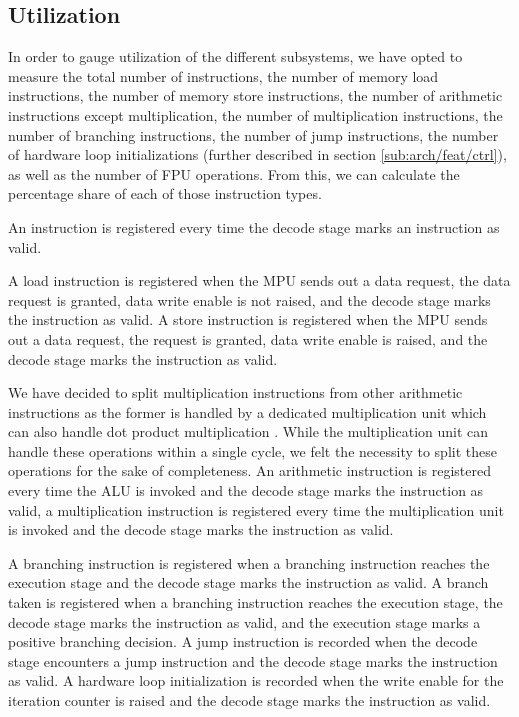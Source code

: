\documentclass[../bachelor_paper.tex]{subfiles}
\begin{document}
\subsection{Utilization}
    \label{sub:arch/feat/ut}
In order to gauge utilization of the different subsystems, we have opted to measure the total number of instructions, the number of memory load instructions, the number of memory store instructions, the number of arithmetic instructions except multiplication, the number of multiplication instructions, the number of branching instructions, the number of jump instructions, the number of hardware loop initializations (further described in section \ref{sub:arch/feat/ctrl}), as well as the number of \ac{FPU} operations. From this, we can calculate the percentage share of each of those instruction types.

An instruction is registered every time the decode stage marks an instruction as valid.

A load instruction is registered when the \ac{MPU}  sends out a data request, the data request is granted, data write enable is not raised, and the decode stage marks the instruction as valid. A store instruction is registered when the \ac{MPU} sends out a data request, the request is granted, data write enable is raised, and the decode stage marks the instruction as valid.

We have decided to split multiplication instructions from other arithmetic instructions as the former is handled by a dedicated multiplication unit which can also handle dot product multiplication \cite{gautschiNearThresholdRISCVCore2017}. While the multiplication unit can handle these operations within a single cycle, we felt the necessity to split these operations for the sake of completeness. An arithmetic instruction is registered every time the \ac{ALU} is invoked and the decode stage marks the instruction as valid, a multiplication instruction is registered every time the multiplication unit is invoked and the decode stage marks the instruction as valid.

A branching instruction is registered when a branching instruction reaches the execution stage and the decode stage marks the instruction as valid. A branch taken is registered when a branching instruction reaches the execution stage, the decode stage marks the instruction as valid, and the execution stage marks a positive branching decision. A jump instruction is recorded when the decode stage encounters a jump instruction and the decode stage marks the instruction as valid. A hardware loop initialization is recorded when the write enable for the iteration counter is raised and the decode stage marks the instruction as valid. 
\end{document}
